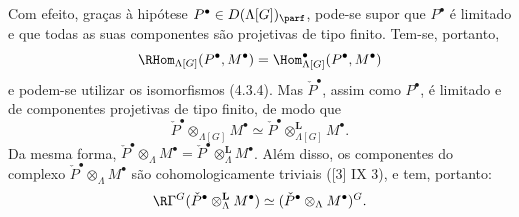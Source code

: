 Com efeito, graças à hipótese $P^\bullet\in D(\Lambda[G])_{\parf}$, pode-se supor que $P^\bullet$ é limitado e que todas as suas componentes são projetivas de tipo finito. Tem-se, portanto,
\[
\RHom_{\Lambda[G]}(P^\bullet,M^\bullet)=\Hom_{\Lambda[G]}^\bullet(P^\bullet,M^\bullet)
\]
e podem-se utilizar os isomorfismos (4.3.4). Mas $\check P^\bullet$, assim como $P^\bullet$, é limitado e de componentes projetivas de tipo finito, de modo que
\[
\check P^\bullet\otimes_{\Lambda[G]}M^\bullet\simeq \check P^\bullet\otimes_{\Lambda[G]}^{\mathbf L}M^\bullet.
\]
Da mesma forma, $\check P^\bullet\otimes_\Lambda M^\bullet=\check P^\bullet\otimes_\Lambda^{\mathbf L}M^\bullet$. Além disso, os componentes do complexo $\check P^\bullet\otimes_\Lambda M^\bullet$ são cohomologicamente triviais ([3] IX 3), e tem, portanto:
\[
\R\Gamma^G(\check P^\bullet\otimes_\Lambda^{\mathbf L}M^\bullet)\simeq (\check P^\bullet\otimes_\Lambda M^\bullet)^G.
\]
